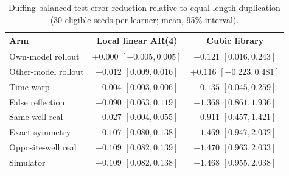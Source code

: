 \begin{table}[H]
\centering\small
\caption{Duffing balanced-test error reduction relative to equal-length duplication (30 eligible seeds per learner; mean, 95\% interval).}
\begin{tabular}{lcc}
\toprule
Arm & Local linear AR(4) & Cubic library\\
\midrule
Own-model rollout & $+0.000$ $[-0.005,0.005]$ & $+0.121$ $[0.016,0.243]$\\
Other-model rollout & $+0.012$ $[0.009,0.016]$ & $+0.116$ $[-0.223,0.481]$\\
Time warp & $+0.004$ $[0.003,0.006]$ & $+0.135$ $[0.045,0.259]$\\
False reflection & $+0.090$ $[0.063,0.119]$ & $+1.368$ $[0.861,1.936]$\\
Same-well real & $+0.027$ $[0.004,0.055]$ & $+0.911$ $[0.457,1.421]$\\
Exact symmetry & $+0.107$ $[0.080,0.138]$ & $+1.469$ $[0.947,2.032]$\\
Opposite-well real & $+0.109$ $[0.082,0.139]$ & $+1.470$ $[0.963,2.033]$\\
Simulator & $+0.109$ $[0.082,0.138]$ & $+1.468$ $[0.955,2.038]$\\
\bottomrule
\end{tabular}
\end{table}

